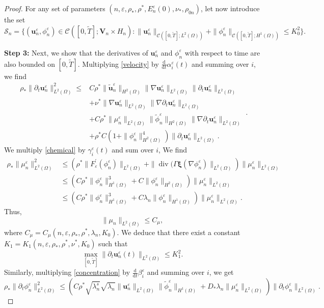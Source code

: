 \documentclass[11pt]{article}
\def\bq{\begin{equation}}
\def\eq{\end{equation}}
\def\bfV{\mathbf{V}}
\def\bfu{\mathbf{u}}
\def\bfxi{\boldsymbol{\xi}}
\def\md{\mathrm{d}}
\def\bq{\begin{equation}}
\def\eq{\end{equation}}
\def\Ga{\Gamma}
\begin{document}
\begin{proof}
For any set of parameters $(n,{\varepsilon},\rho_*,\rho^*, E_n^{\varepsilon}(0), \nu_*,\rho_{0n})$, let now introduce the set
$$ \mathcal{S}_n = \{ (\bfu_n^{\varepsilon} ,\phi_n^{\varepsilon}) \in \mathcal{C}([0,\widetilde{T}];\bfV_n\times H_n) : \|\bfu_n^{\varepsilon}\|_{\mathcal{C}([0,\widetilde{T}];L^2(\Omega))} + \|\phi_n^{\varepsilon}\|_{\mathcal{C}([0,\widetilde{T}];H^1(\Omega))}\leq K_0^2\}.$$


\textbf{Step 3:} Next, we show that the derivatives of $\bfu_n^{\varepsilon}$ and $\phi_n^{\varepsilon}$ with respect to time are also bounded on $[0,\widetilde{T}]$. Multiplying \eqref{velocity} by $\frac{\md}{\md t}\alpha_i^{\varepsilon}(t)$ and summing over $i$, we find
$$
\begin{aligned}
\rho_*  \|\partial_t \bfu_n^{\varepsilon}\|_{L^2(\Omega)}^2\leq  & C \rho^*\|\widetilde{\bfu}_n^{\varepsilon}\|_{H^2(\Omega)}\|\nabla \bfu_n^{\varepsilon}\|_{L^2(\Omega)}\|\partial_t \bfu_n^{\varepsilon}\|_{L^2(\Omega)}\\
&+\nu^*\|\nabla \bfu_n^{\varepsilon}\|_{L^2(\Omega)}\|\nabla \partial_t \bfu_n^{\varepsilon}\|_{L^2(\Omega)}\\
& +C \rho^*\|\mu_n^{\varepsilon}\|_{L^2(\Omega)}\|\widetilde{\phi}_n^{\varepsilon}\|_{H^2(\Omega)}\|\nabla \partial_t \bfu_n^{\varepsilon}\|_{L^2(\Omega)}\\&+\rho^* C\left(1+\|\phi_n^{\varepsilon}\|_{H^2(\Omega)}^4\right)\|\partial_t \bfu_n^{\varepsilon}\|_{L^2(\Omega)}.
\end{aligned}.
$$
We multiply \eqref{chemical} by $\gamma_i^{\varepsilon}(t)$ and sum over $i$, We find
$$\begin{aligned}
\rho_{*} \|\mu_n^{\varepsilon}\|^2_{L^2(\Omega)} &\leq \left(\rho^* \|F_{\varepsilon}^{\prime} (\phi_n^{\varepsilon})\|_{L^2(\Omega)}+\|\operatorname{div}(\Ga\bfxi(\nabla\phi_n^{\varepsilon})\|_{L^2(\Omega)}\right)\|\mu_n^{\varepsilon}\|_{L^2(\Omega)}\\
&\leq \left(C\rho^* \|\phi_n^{\varepsilon}\|^3_{H^1(\Omega)} +C \|\phi_n^{\varepsilon}\|_{H^2(\Omega)}\right)\|\mu_n^{\varepsilon}\|_{L^2(\Omega)}\\
&\leq \left(C\rho^* \|\phi_n^{\varepsilon}\|^3_{H^1(\Omega)}+C \lambda_n\|\phi_n^{\varepsilon}\|_{H^1(\Omega)}\right)\|\mu_n^{\varepsilon}\|_{L^2(\Omega)}.
\end{aligned}
$$
Thus,
\bq
\|\mu_n\|_{L^2(\Omega)} \leq C_{\mu}\label{estim_nu},
\eq
where $C_{\mu} = C_{\mu}(n,{\varepsilon},\rho_*,\rho^*, \lambda_n, K_0) $. We deduce that there exist a constant $K_1 = K_1(n,{\varepsilon},\rho_*,\rho^*, \nu^*,K_0)$ such that
\bq
\max_{[0,\widetilde{T}]}\|\partial_t\bfu_n^{\varepsilon}(t)\|_{L^2(\Omega)}\leq K_1^2.
\eq
Similarly, multiplying \eqref{concentration} by $\frac{\mathrm{d}}{\mathrm{d} t} \beta_i^{\varepsilon}$ and summing over $i$, we get
$$
\rho_*\|\partial_t \phi_n^{\varepsilon}\|^2_{L^2(\Omega)} 
\leq\left(C \rho^* \sqrt{\lambda_n^s} \sqrt{\lambda_n}\|\bfu_n^{\varepsilon}\|_{L^2(\Omega)}\|\widetilde{\phi}_n^{\varepsilon}\|_{H^1(\Omega)}+D_{*}\lambda_n\|\mu_n^{\varepsilon}\|_{L^2(\Omega)}\right)\|\partial_t \phi_n^{\varepsilon}\|_{L^2(\Omega)} .
$$


\end{proof}
\end{document}
